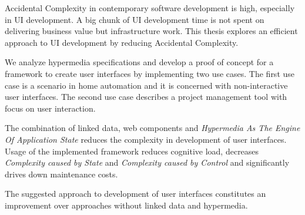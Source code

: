 Accidental Complexity in contemporary software development is high, especially in UI development. A big chunk of UI development time is not spent on delivering business value but infrastructure work. This thesis explores an efficient approach to UI development by reducing Accidental Complexity.

We analyze hypermedia specifications and develop a proof of concept for a framework to create user interfaces by implementing two use cases. The first use case is a scenario in home automation and it is concerned with non-interactive user interfaces. The second use case describes a project management tool with focus on user interaction.

The combination of linked data, web components and \textit{Hypermedia As The Engine Of Application State} reduces the complexity in development of user interfaces. Usage of the implemented framework reduces \gls{cognitive load}, decreases \textit{Complexity caused by State} and \textit{Complexity caused by Control} and significantly drives down maintenance costs.

The suggested approach to development of user interfaces constitutes an improvement over approaches without linked data and hypermedia.
